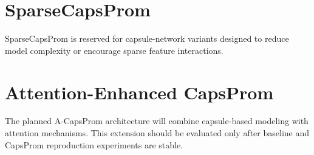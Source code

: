 \section{SparseCapsProm}\label{sec:models-sparsecapsprom}

SparseCapsProm is reserved for capsule-network variants designed to reduce
model complexity or encourage sparse feature interactions. \pendingresults

\section{Attention-Enhanced CapsProm}\label{sec:models-acapsprom}

The planned A-CapsProm architecture will combine capsule-based modeling with
attention mechanisms. This extension should be evaluated only after baseline and
CapsProm reproduction experiments are stable.
